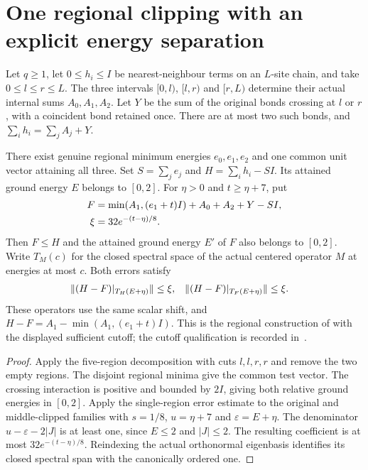 \section{One regional clipping with an explicit energy separation}

\begin{lemma}
    \label{lem:alvv_single_region_residuals}
    \leanok
    Let $q\ge1$, let $0\le h_i\le I$ be nearest-neighbour terms on an
    $L$-site chain, and take $0\le l\le r\le L$.
    The three intervals ${\lbrack 0,l)}$, ${\lbrack l,r)}$ and ${\lbrack r,L)}$ determine their actual
    internal sums $A_0,A_1,A_2$. Let $Y$ be the sum of the original bonds
    crossing at $l$ or $r$, with a coincident bond retained once.
    There are at most two such bonds, and $\sum_i h_i=\sum_j A_j+Y$.

    There exist genuine regional minimum energies $e_0,e_1,e_2$ and one
    common unit vector attaining all three. Set $S=\sum_j e_j$ and
    $H=\sum_i h_i-SI$. Its attained ground energy $E$ belongs to $[0,2]$.
    For $\eta>0$ and $t\ge\eta+7$, put
    \begin{align}
        F   & =\min(A_1,(e_1+t)I)+A_0+A_2+Y-SI,\notag \\
        \xi & =32e^{-(t-\eta)/8}.\notag
    \end{align}
    Then $F\le H$ and the attained ground energy $E'$ of $F$ also belongs
    to $[0,2]$. Write $T_M(c)$ for the closed spectral space of the actual
    centered operator $M$ at energies at most $c$. Both errors satisfy
    \begin{align}
        \|(H-F)|_{T_H(E+\eta)}\| & \le\xi,       &
        \|(H-F)|_{T_F(E+\eta)}\| & \le\xi.\notag
    \end{align}
    These operators use the same scalar shift, and
    $H-F=A_1-\min(A_1,(e_1+t)I)$.
    This is the regional construction of
    \cite[Definition~4.3 and Proposition~4.4(1)]{Arad2016RigorousRG}
    with the displayed sufficient cutoff; the cutoff qualification is recorded
    in~\cite{gap:alvv16_hard_truncation_windows}.
\end{lemma}
\begin{proof}\leanok
    Apply the five-region decomposition with cuts $l,l,r,r$ and remove the
    two empty regions. The disjoint regional minima give the common test
    vector. The crossing interaction is positive and bounded by $2I$,
    giving both relative ground energies in $[0,2]$.
    Apply the single-region error estimate to the original and middle-clipped
    families with $s=1/8$, $u=\eta+7$ and $\varepsilon=E+\eta$.
    The denominator $u-\varepsilon-2|J|$ is at least one, since $E\le2$
    and $|J|\le2$. The resulting coefficient is at most
    $32e^{-(t-\eta)/8}$. Reindexing the actual orthonormal eigenbasis
    identifies its closed spectral span with the canonically ordered one.
\end{proof}

